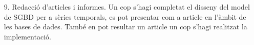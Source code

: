 \begin{itemize}
\item[9.] Redacció d'articles i informes. Un cop s'hagi completat el
  disseny del model de SGBD per a sèries temporals, es pot presentar
  com a article en l'àmbit de les bases de dades.  També en pot
  resultar un article un cop s'hagi realitzat la implementació.


\end{itemize}




